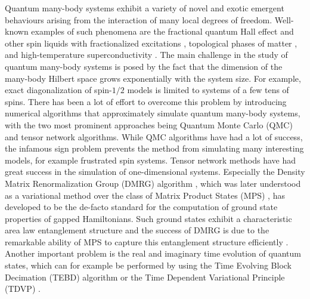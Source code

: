 Quantum many-body systems exhibit a variety of novel and exotic emergent behaviours arising from the interaction of many local degrees of freedom. Well-known examples of such phenomena are the fractional quantum Hall effect \cite{cite:two_dimensional_magnetotransport_in_the_extreme_quantum_limit, cite:anomalous_quantum_hall_effect_an_incompressible_quantum_fluid_with_fractionally_charged_excitations, cite:the_fractional_QHE} and other spin liquids with fractionalized excitations \cite{cite:fractionalized_excitations_in_the_spin_liquid_state_of_a_kagome_lattice_AFM}, topological phases of matter \cite{cite:colloqium_zoo_of_quantum_topological_phases_of_matter}, and high-temperature superconductivity \cite{cite:possible_high_T_c_superconductivity_in_the_Ba_La_Cu_O_system, cite:doping_a_mott_insulator_physics_of_high_temperature_superconductivity}. The main challenge in the study of quantum many-body systems is posed by the fact that the dimension of the many-body Hilbert space grows exponentially with the system size. For example, exact diagonalization of spin-$1/2$ models is limited to systems of a few tens of spins. There has been a lot of effort to overcome this problem by introducing numerical algorithms that approximately simulate quantum many-body systems, with the two most prominent approaches being Quantum Monte Carlo (QMC) \cite{cite:quantum_monte_carlo_simulation_method_for_spin_systems, cite:computational_studies_of_quantum_spin_systems} and tensor network algorithms. While QMC algorithms have had a lot of success, the infamous sign problem \cite{cite:computational_studies_of_quantum_spin_systems, cite:sign_problem_in_numerical_simulation_of_many_electron_systems} prevents the method from simulating many interesting models, for example frustrated spin systems. Tensor network methods have had great success in the simulation of one-dimensional systems. Especially the Density Matrix Renormalization Group (DMRG) algorithm \cite{cite:density_matrix_formulation_for_quantum_renormalization_groups}, which was later understood as a variational method over the class of Matrix Product States (MPS) \cite{cite:equivalence_of_the_variational_mps_and_the_dmrg_applied_to_spin_chains, cite:DMRG_in_the_age_of_MPS, cite:practical_introduction_MPS_and_PEPS}, has developed to be the de-facto standard for the computation of ground state properties of gapped Hamiltonians. Such ground states exhibit a characteristic area law entanglement structure \cite{cite:area_law_1D_proof} and the success of DMRG is due to the remarkable ability of MPS to capture this entanglement structure efficiently \cite{cite:area_laws_review, cite:mps_represent_ground_states_faithfully}. Another important problem is the real and imaginary time evolution of quantum states, which can for example be performed by using the Time Evolving Block Decimation (TEBD) \cite{cite:efficient_simulation_of_1D_quantum_many_body_systems} algorithm or the Time Dependent Variational Principle (TDVP) \cite{cite:time_dependent_variational_principle_for_quantum_lattices}.
